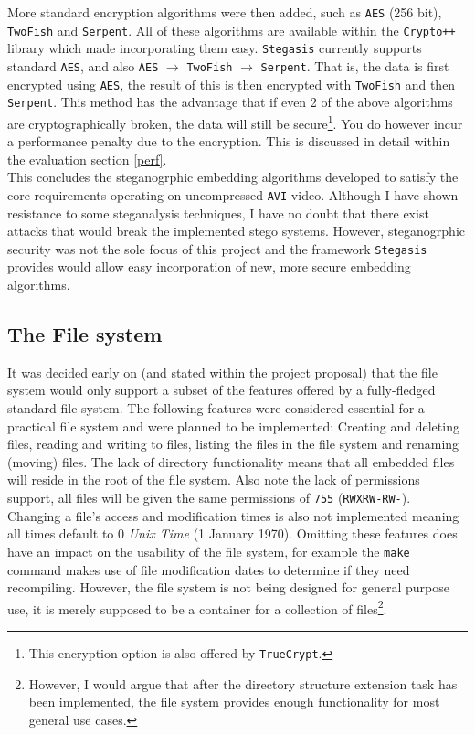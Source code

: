 \documentclass[paper=a4, fontsize=11pt,twoside]{scrartcl}
\numberwithin{table}{section}
\numberwithin{figure}{section}
\numberwithin{algorithm}{section}
\begin{document}
\noindent
More standard encryption algorithms were then added, such as \texttt{AES} (256 bit), \texttt{TwoFish} and \texttt{Serpent}. All of these algorithms are available within the \texttt{Crypto++} library which made incorporating them easy. \texttt{Stegasis} currently supports standard \texttt{AES}, and also \texttt{AES} $\rightarrow$ \texttt{TwoFish} $\rightarrow$ \texttt{Serpent}. That is, the data is first encrypted using \texttt{AES}, the result of this is then encrypted with \texttt{TwoFish} and then \texttt{Serpent}. This method has the advantage that if even 2 of the above algorithms are cryptographically broken, the data will still be secure\footnote{This encryption option is also offered by \texttt{TrueCrypt}.}. You do however incur a performance penalty due to the encryption. This is discussed in detail within the evaluation section \ref{perf}.\\

\noindent
This concludes the steganogrphic embedding algorithms developed to satisfy the core requirements operating on uncompressed \texttt{AVI} video. Although I have shown resistance to some steganalysis techniques, I have no doubt that there exist attacks that would break the implemented stego systems. However, steganogrphic security was not the sole focus of this project and the framework \texttt{Stegasis} provides would allow easy incorporation of new, more secure embedding algorithms.


\subsection{The File system}
\label{fsi}

It was decided early on (and stated within the project proposal) that the file system would only support a subset of the features offered by a fully-fledged standard file system. The following features were considered essential for a practical file system and were planned to be implemented: Creating and deleting files, reading and writing to files, listing the files in the file system and renaming (moving) files. The lack of directory functionality means that all embedded files will reside in the root of the file system. Also note the lack of permissions support, all files will be given the same permissions of \texttt{755} (\texttt{RWXRW-RW-}). Changing a file's access and modification times is also not implemented meaning all times default to 0 \textit{Unix Time} (1 January 1970). Omitting these features does have an impact on the usability of the file system, for example the \texttt{make} command makes use of file modification dates to determine if they need recompiling. However, the file system is not being designed for general purpose use, it is merely supposed to be a container for a collection of files\footnote{However, I would argue that after the directory structure extension task has been implemented, the file system provides enough functionality for most general use cases.}.
\end{document}
